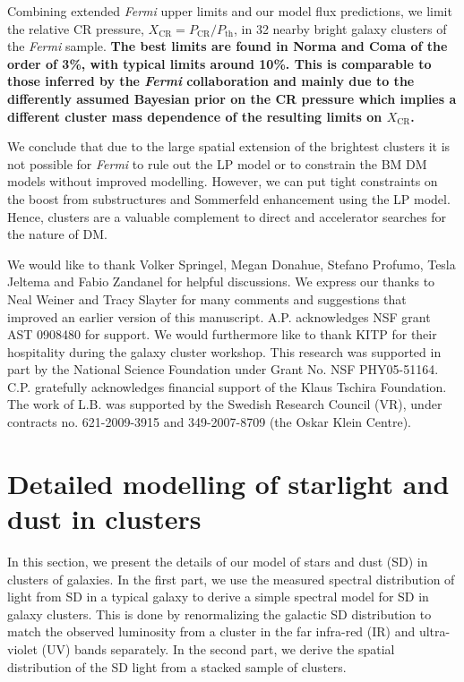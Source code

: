 \documentclass[10pt,aps,pra,reprint,amsmath,amsfonts,amssymb,showpacs,nofootinbib,floatfix]{revtex4-1}
\def\C#1{{\bf #1}}
\newcommand{\Fermi}{{\em Fermi}\xspace}
\newcommand{\rmn}{\mathrm}
\newcommand{\CR}{\rmn{CR}}
\begin{document}
Combining extended \Fermi upper limits and our model flux predictions,
we limit the relative CR pressure, $X_\CR = P_\CR/P_\rmn{th}$, in 32
nearby bright galaxy clusters of the \Fermi sample. \C{The best limits
  are found in Norma and Coma of the order of 3\%, with typical limits
  around 10\%. This is comparable to those inferred by the \Fermi
  collaboration \cite{2010ApJ...717L..71A} and mainly due to the
  differently assumed Bayesian prior on the CR pressure which implies
  a different cluster mass dependence of the resulting limits on
  $X_\CR$.}

We conclude that due to the large spatial extension of the brightest
clusters it is not possible for \Fermi to rule out the LP model or to
constrain the BM DM models without improved modelling. However, we can
put tight constraints on the boost from substructures and Sommerfeld
enhancement using the LP model. Hence, clusters are a valuable
complement to direct and accelerator searches for the nature of DM.



\smallskip We would like to thank Volker Springel, Megan Donahue,
Stefano Profumo, Tesla Jeltema and Fabio Zandanel for helpful
discussions.  We express our thanks to Neal Weiner and Tracy Slayter
for many comments and suggestions that improved an earlier version of
this manuscript. A.P. acknowledges NSF grant AST 0908480 for
support. We would furthermore like to thank KITP for their hospitality
during the galaxy cluster workshop.  This research was supported in
part by the National Science Foundation under Grant No. NSF
PHY05-51164.  C.P. gratefully acknowledges financial support of the
Klaus Tschira Foundation. The work of L.B. was supported by the
Swedish Research Council (VR), under contracts no. 621-2009-3915 and
349-2007-8709 (the Oskar Klein Centre).


\vspace{-0.7cm}

%
%

\appendix

\section{Detailed modelling of starlight and dust in clusters}
\label{sect:SD}
In this section, we present the details of our model of stars and dust
(SD) in clusters of galaxies. In the first part, we use the measured
spectral distribution of light from SD in a typical galaxy to derive a
simple spectral model for SD in galaxy clusters. This is done by
renormalizing the galactic SD distribution to match the observed luminosity
from a cluster in the far infra-red (IR) and ultra-violet (UV) bands
separately. In the second part, we derive the spatial distribution of
the SD light from a stacked sample of clusters.
\end{document}
